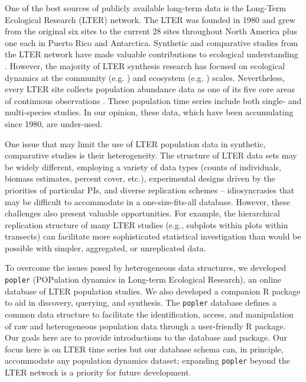 \documentclass{article}\usepackage[]{graphicx}\usepackage[]{color}
\begin{document}
One of the best sources of publicly available long-term data is the Long-Term Ecological Research (LTER) network. The LTER was founded in 1980 and grew from the original six sites to the current 28 sites throughout North America plus one each in Puerto Rico and Antarctica. Synthetic and comparative studies from the LTER network have made valuable contributions to ecological understanding \citep{Knapp2012}. However, the majority of LTER synthesis research has focused on ecological dynamics at the community (e.g. \cite{Wilcox2017}) and ecosystem (e.g. \cite{Knapp2001}) scales. Nevertheless, every LTER site collects population abundance data as one of its five core areas of continuous observations \citep{Callahan1984}. These population time series include both single- and multi-species studies. In our opinion, these data, which have been accumulating since 1980, are under-used. 

One issue that may limit the use of LTER population data in synthetic, comparative studies is their heterogeneity. The structure of LTER data sets may be widely different, employing a variety of data types (counts of individuals, biomass estimates, percent cover, etc.), experimental designs driven by the priorities of particular PIs, and diverse replication schemes – idiosyncrasies that may be difficult to accommodate in a one-size-fits-all database. However, these challenges also present valuable opportunities. For example, the hierarchical replication structure of many LTER studies (e.g., subplots within plots within transects) can facilitate more sophisticated statistical investigation than would be possible with simpler, aggregated, or unreplicated data. %

To overcome the issues posed by heterogeneous data structures, we developed \texttt{popler} (POPulation dynamics in Long-term Ecological Research), an online database of LTER population studies. We also developed a companion R package to aid in discovery, querying, and synthesis. The \texttt{popler} database defines a common data structure to facilitate the identification, access, and manipulation of raw and heterogeneous population data through a user-friendly R package. Our goals here are to provide introductions to the database and package. Our focus here is on LTER time series but our database schema can, in principle, accommodate any population dynamics dataset; expanding \texttt{popler} beyond the LTER network is a priority for future development.
\end{document}
